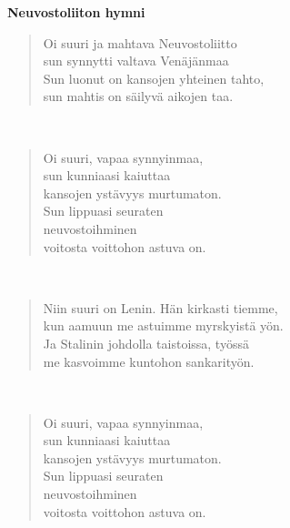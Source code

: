 \noindent\begin{minipage}{\linewidth}
\vspace{5pt}
\parbox[t]{0.85\linewidth}{\raggedright {\large\bf Neuvostoliiton hymni}\\[6pt]}
\begin{verse}
	Oi suuri ja mahtava Neuvostoliitto\\
	sun synnytti valtava Venäjänmaa\\
	Sun luonut on kansojen yhteinen tahto,\\
	sun mahtis on säilyvä aikojen taa.\\
\end{verse}
\end{minipage}\\[10pt]
\noindent\begin{minipage}{\linewidth}
\begin{verse}
	Oi suuri, vapaa synnyinmaa,\\
	sun kunniaasi kaiuttaa\\
	kansojen ystävyys murtumaton.\\
	Sun lippuasi seuraten\\
	neuvostoihminen\\
	voitosta voittohon astuva on.\\
\end{verse}
\end{minipage}\\[10pt]
\noindent\begin{minipage}{\linewidth}
\begin{verse}
	Niin suuri on Lenin. Hän kirkasti tiemme,\\
	kun aamuun me astuimme myrskyistä yön.\\
	Ja Stalinin johdolla taistoissa, työssä\\
	me kasvoimme kuntohon sankarityön.\\
\end{verse}
\end{minipage}\\[10pt]
\noindent\begin{minipage}{\linewidth}
\begin{verse}
	Oi suuri, vapaa synnyinmaa,\\
	sun kunniaasi kaiuttaa\\
	kansojen ystävyys murtumaton.\\
	Sun lippuasi seuraten\\
	neuvostoihminen\\
	voitosta voittohon astuva on.\\
\end{verse}
\end{minipage}\\[10pt]
